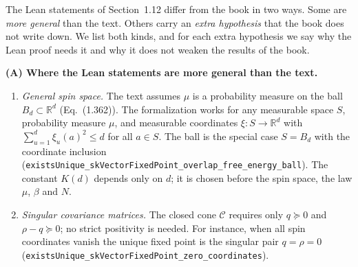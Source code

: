 \begin{remark}\label{rem:sg-tal:vector-hypotheses}
The Lean statements of Section~1.12 differ from the book in two ways.
Some are \emph{more general} than the text.
Others carry an \emph{extra hypothesis} that the book does not write down.
We list both kinds, and for each extra hypothesis we say why the Lean proof needs it and why it
does not weaken the results of the book.

\medskip\noindent\textbf{(A) Where the Lean statements are more general than the text.}
\begin{enumerate}
\item \emph{General spin space.} The text assumes $\mu$ is a probability measure on the ball
$B_d\subset\mathbb R^d$ (Eq.~(1.362)). The formalization works for any measurable space $S$, probability
measure $\mu$, and measurable coordinates $\xi:S\to\mathbb R^d$ with $\sum_{u=1}^d \xi_u(a)^2\le d$ for all
$a\in S$. The ball is the special case $S=B_d$ with the coordinate inclusion
(\texttt{existsUnique\_skVectorFixedPoint\_overlap\_free\_energy\_ball}). The constant $K(d)$ depends only on
$d$; it is chosen before the spin space, the law $\mu$, $\beta$ and $N$.
\item \emph{Singular covariance matrices.} The closed cone $\mathcal C$ requires only $q\succeq0$ and
$\rho-q\succeq0$; no strict positivity is needed. For instance, when all spin coordinates vanish the unique
fixed point is the singular pair $q=\rho=0$
(\texttt{existsUnique\_skVectorFixedPoint\_zero\_coordinates}).
\end{enumerate}


\end{remark}
